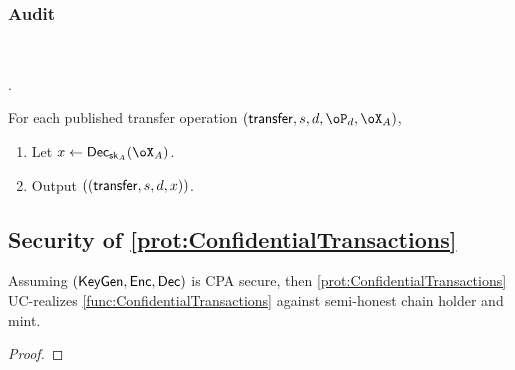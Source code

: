 \subsubsection{Audit} 

\begin{protocol}~\label{prot:ConfidentialTransactions:Audit}
	\item[Parties:] \Auditor.
	
	
	
	
	\item[Operation:]   For each  published transfer operation   $(\transfer,s,d,\oP_d,\oX_A)$,  \Auditor
	
	\begin{enumerate}
		\item Let $x \asn \Dec_{\sk_A} (\oX_A)$.
		
		\item Output $((\mathsf{transfer},s,d,x))$.
	\end{enumerate}
	
\end{protocol}





\subsection{Security of \cref{prot:ConfidentialTransactions}}
\begin{theorem}\label{thm:ConfidentialTransactions}
Assuming  $(\mathsf{KeyGen},\mathsf{Enc},\mathsf{Dec})$ is CPA secure, then \cref{prot:ConfidentialTransactions} UC-realizes \cref{func:ConfidentialTransactions} against semi-honest chain holder and mint.
\end{theorem}

\begin{proof}
\end{proof}

